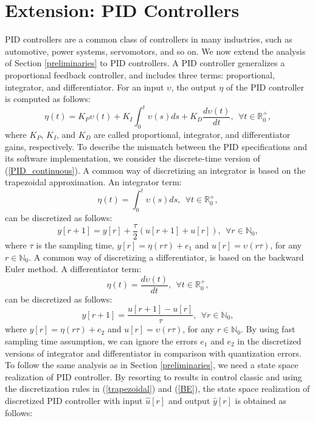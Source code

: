 \documentclass{amsart}
\numberwithin{equation}{section}
\newcommand{\R}{{\mathbb{R}}}
\newcommand{\N}{{\mathbb{N}}}
\begin{document}
\section{Extension: PID Controllers}\label{PID}

PID controllers are a common class of controllers in many industries, such as automotive, power systems, servomotors, and so on. 
We now extend the analysis of Section \ref{preliminaries} to PID controllers. 
A PID controller generalizes a proportional feedback controller, and includes three terms: proportional, integrator, and differentiator. 
For an input $\upsilon$, the output $\eta$ of the PID controller is computed as follows:
\begin{equation}\label{PID_continuous}
\eta(t)=K_P\upsilon(t)+K_I\int_0^t\upsilon(s)ds+K_D\frac{d\upsilon(t)}{dt},~~\forall t\in\R_0^+,
\end{equation}   
where $K_P$, $K_I$, and $K_D$ are called proportional, integrator, and differentiator gains, respectively. 
To describe the mismatch between the PID specifications and its software implementation, 
we consider the discrete-time version of (\ref{PID_continuous}). 
A common way of discretizing an integrator is based on the trapezoidal approximation. 
An integrator term:
\begin{equation}\nonumber
\eta(t)=\int_0^t\upsilon(s)ds,~~\forall t\in\R_0^+,
\end{equation}  
can be discretized as follows:
\begin{equation}\label{trapezoidal}
y[r+1]=y[r]+\frac{\tau}{2}\left(u[r+1]+u[r]\right),~~\forall r\in\N_0,
\end{equation}  
where $\tau$ is the sampling time, $y[r]=\eta(r\tau)+e_1$ and $u[r]=\upsilon(r\tau)$, for any $r\in\N_0$. A common way of discretizing a differentiator, is based on the backward Euler method. A differentiator term:
\begin{equation}\nonumber
\eta(t)=\frac{d\upsilon(t)}{dt},~~\forall t\in\R_0^+,
\end{equation}  
can be discretized as follows:
\begin{equation}\label{BE}
y[r+1]=\frac{u[r+1]-u[r]}{\tau},~~\forall r\in\N_0,
\end{equation}  
where $y[r]=\eta(r\tau)+e_2$ and $u[r]=\upsilon(r\tau)$, for any $r\in\N_0$. By using fast sampling time assumption, we can ignore the errors $e_1$ and $e_2$ in the discretized versions of integrator and differentiator in comparison with quantization errors. To follow the same analysis as in Section \ref{preliminaries}, we need a state space realization of PID controller. By resorting to results in control classic \cite{kailath} and using the discretization rules in (\ref{trapezoidal}) and (\ref{BE}), the state space realization of discretized PID controller with input $\widehat{u}[r]$ and output $\widehat{y}[r]$ is obtained as follows:
\end{document}
